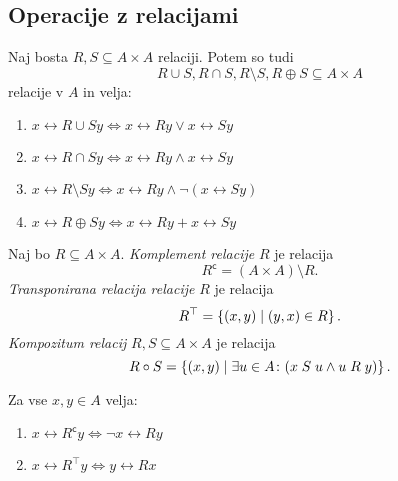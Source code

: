\documentclass[12pt, a4paper]{article}
\renewcommand{\iff}{\Leftrightarrow}
\begin{document}
\obvs

\newpage

\subsection{Operacije z relacijami}

\begin{trditev}
Naj bosta $R,S\subseteq A\times A$ relaciji. Potem so tudi
\[
R\cup S, R\cap S, R\setminus S, R\oplus S\subseteq A\times A
\]
relacije v $A$ in velja:

\begin{enumerate}
\item $x\rel{R\cup S}y\iff x\rel{R}y\lor x\rel{S}y$
\item $x\rel{R\cap S}y\iff x\rel{R}y\land x\rel{S}y$
\item $x\rel{R\setminus S}y\iff x\rel{R}y\land\neg(x\rel{S}y)$
\item $x\rel{R\oplus S}y\iff x\rel{R}y+x\rel{S}y$
\end{enumerate}
\end{trditev}

\begin{okvir}
\begin{definicija}
Naj bo $R\subseteq A\times A$. \emph{Komplement relacije} $R$ je relacija
\[
R^\mathsf{c}=(A\times A)\setminus R.
\]
\emph{Transponirana relacija relacije} $R$ je relacija
\[
R^\top=\left\{(x,y)\mid (y,x)\in R\right\}.
\]
\emph{Kompozitum relacij} $R,S\subseteq A\times A$ je relacija
\[
R\circ S=\left\{(x,y)\mid\exists u\in A\colon(x\mathrel{S}u\land u\mathrel{R}y)\right\}.
\]
\end{definicija}
\end{okvir}

\begin{trditev}
Za vse $x,y\in A$ velja:

\begin{enumerate}
\item $x \rel{R^\mathsf{c}}y\iff \neg x\rel{R}y$
\item $x\rel{R^\top}y\iff y\rel{R}x$
\end{enumerate}
\end{trditev}
\end{document}
